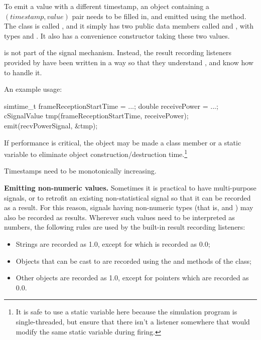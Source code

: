 To emit a value with a different timestamp, an object containing
a $(timestamp, value)$ pair needs to be filled in, and emitted using
the  method. The class is called
, and it simply has two public data members called
 and , with types  and .
It also has a convenience constructor taking these two values.

\begin{note}
 is not part of the signal mechanism. Instead,
the result recording listeners provided by {\opp} have been written
in a way so that they understand , and know how
to handle it.
\end{note}

An example usage:

\begin{cpp}
simtime_t frameReceptionStartTime = ...;
double receivePower = ...;
cSignalValue tmp(frameReceptionStartTime, receivePower);
emit(recvPowerSignal, &tmp);
\end{cpp}

If performance is critical, the  object may be
made a class member or a static variable to eliminate object
construction/destruction time.\footnote{It is safe to use a static
variable here because the simulation program is single-threaded,
but ensure that there isn't a listener somewhere that would modify
the same static variable during firing.}

Timestamps need to be monotonically increasing.

\textbf{Emitting non-numeric values.} Sometimes it is practical to have
multi-purpose signals, or to retrofit an existing non-statistical signal so
that it can be recorded as a result. For this reason, signals having
non-numeric types (that is,  and ) may
also be recorded as results. Wherever such values need to be interpreted as
numbers, the following rules are used by the built-in result recording
listeners:

\begin{itemize}
  \item Strings are recorded as 1.0, except for  which is recorded as 0.0;
  \item Objects that can be cast to  are recorded
     using the  and 
     methods of the class;
  \item Other objects are recorded as 1.0, except for  pointers which
     are recorded as 0.0.
\end{itemize}

